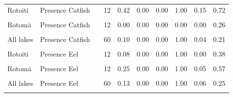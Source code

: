 \documentclass[
  12pt,
  a4paper,
  oneside]{scrbook}
\begin{document}
\begin{longtable}[t]{lllrrrrrrr}
Rotoiti & Presence Catfish &  & 12 & 0.42 & 0.00 & 0.00 & 1.00 & 0.15 & 0.72\\
\cellcolor{gray!8}{Rotoehu} & \cellcolor{gray!8}{Presence Catfish} & \cellcolor{gray!8}{} & \cellcolor{gray!8}{12} & \cellcolor{gray!8}{0.00} & \cellcolor{gray!8}{0.00} & \cellcolor{gray!8}{0.00} & \cellcolor{gray!8}{0.00} & \cellcolor{gray!8}{0.00} & \cellcolor{gray!8}{0.26}\\
Rotomā & Presence Catfish &  & 12 & 0.00 & 0.00 & 0.00 & 0.00 & 0.00 & 0.26\\
\addlinespace
\cellcolor{gray!8}{Ōkāreka} & \cellcolor{gray!8}{Presence Catfish} & \cellcolor{gray!8}{} & \cellcolor{gray!8}{12} & \cellcolor{gray!8}{0.00} & \cellcolor{gray!8}{0.00} & \cellcolor{gray!8}{0.00} & \cellcolor{gray!8}{0.00} & \cellcolor{gray!8}{0.00} & \cellcolor{gray!8}{0.26}\\
All lakes & Presence Catfish &  & 60 & 0.10 & 0.00 & 0.00 & 1.00 & 0.04 & 0.21\\
\cellcolor{gray!8}{Rotorua} & \cellcolor{gray!8}{Presence Eel} & \cellcolor{gray!8}{} & \cellcolor{gray!8}{12} & \cellcolor{gray!8}{0.33} & \cellcolor{gray!8}{0.00} & \cellcolor{gray!8}{0.00} & \cellcolor{gray!8}{1.00} & \cellcolor{gray!8}{0.10} & \cellcolor{gray!8}{0.65}\\
Rotoiti & Presence Eel &  & 12 & 0.08 & 0.00 & 0.00 & 1.00 & 0.00 & 0.38\\
\cellcolor{gray!8}{Rotoehu} & \cellcolor{gray!8}{Presence Eel} & \cellcolor{gray!8}{} & \cellcolor{gray!8}{12} & \cellcolor{gray!8}{0.00} & \cellcolor{gray!8}{0.00} & \cellcolor{gray!8}{0.00} & \cellcolor{gray!8}{0.00} & \cellcolor{gray!8}{0.00} & \cellcolor{gray!8}{0.26}\\
\addlinespace
Rotomā & Presence Eel &  & 12 & 0.25 & 0.00 & 0.00 & 1.00 & 0.05 & 0.57\\
\cellcolor{gray!8}{Ōkāreka} & \cellcolor{gray!8}{Presence Eel} & \cellcolor{gray!8}{} & \cellcolor{gray!8}{12} & \cellcolor{gray!8}{0.00} & \cellcolor{gray!8}{0.00} & \cellcolor{gray!8}{0.00} & \cellcolor{gray!8}{0.00} & \cellcolor{gray!8}{0.00} & \cellcolor{gray!8}{0.26}\\
All lakes & Presence Eel &  & 60 & 0.13 & 0.00 & 0.00 & 1.00 & 0.06 & 0.25\\
\cellcolor{gray!8}{Rotorua} & \cellcolor{gray!8}{Presence Goldfish} & \cellcolor{gray!8}{} & \cellcolor{gray!8}{12} & \cellcolor{gray!8}{0.08} & \cellcolor{gray!8}{0.00} & \cellcolor{gray!8}{0.00} & \cellcolor{gray!8}{1.00} & \cellcolor{gray!8}{0.00} & \cellcolor{gray!8}{0.38}\\

\end{longtable}
\end{document}
